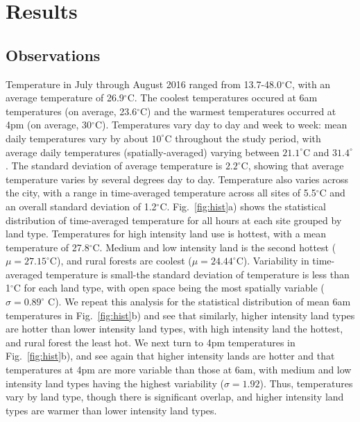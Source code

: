 \documentclass[draft,linenumbers]{agujournal}
\begin{document}
\section{Results}\label{sec:results} 
\subsection{Observations}
Temperature in July through August 2016 ranged from 13.7-48.0$^\circ$C, with an average temperature of 26.9$^\circ$C. The coolest temperatures occured at 6am temperatures (on average, 23.6$^\circ$C) and the warmest temperatures occurred at 4pm (on average,  30$^\circ$C). 
Temperatures vary day to day and week to week: mean daily temperatures vary by about $10^\circ$C throughout the study period, with average daily temperatures (spatially-averaged) varying between $21.1^\circ$C and $31.4^\circ$. The standard deviation of average temperature is $2.2^\circ$C, showing that average temperature varies by several degrees day to day. 
Temperature also varies across the city, with a range in time-averaged temperature across all sites of 5.5$^\circ$C and an overall standard deviation of 1.2$^\circ$C. Fig.~\ref{fig:hist}a) shows the statistical distribution of time-averaged temperature for all hours at each site grouped by land type. 
Temperatures %
for high intensity land use is hottest, with a mean temperature of 27.8$^\circ$C. Medium and low intensity land is the second hottest ($\mu = 27.15^\circ$C), and rural forests are coolest ($\mu = 24.44^\circ$C). 
Variability in time-averaged temperature is small-the standard deviation of temperature is less than 1$^\circ$C for each land type, with open space being the most spatially variable ($\sigma = 0.89^\circ$ C). We repeat this analysis for the statistical distribution of mean 6am temperatures in Fig.~\ref{fig:hist}b) and see that similarly, higher intensity land types are hotter than lower intensity land types, with high intensity land the hottest, and rural forest the least hot. We next turn to 4pm temperatures in Fig.~\ref{fig:hist}b), and see again that higher intensity lands are hotter and that temperatures at 4pm are more variable than those at 6am, with medium and low intensity land types having the highest variability ($\sigma = 1.92$). 
Thus, temperatures vary by land type, though there is significant overlap, and higher intensity land types are warmer than lower intensity land types. 
\end{document}
